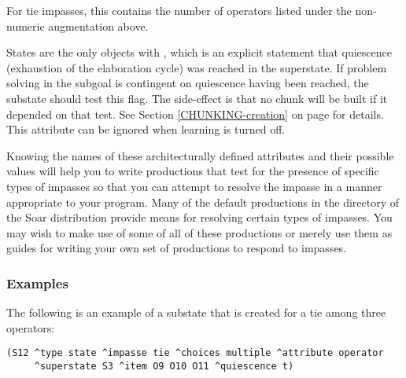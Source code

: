 \begin{description}
	\vspace{-8pt}
\item [\soar{\carat non-numeric-count}] 
	For tie impasses, this contains the number of operators listed under the non-numeric augmentation above.
	\vspace{-8pt}
\item [\soar{\carat quiescence}] 
	States are the only objects with , which is an explicit statement that quiescence (exhaustion of the elaboration cycle) was reached in the superstate.  If problem solving in the subgoal is contingent on quiescence having been reached, the substate should test this flag. The side-effect is that no chunk will be built if it depended on that test. See Section \ref{CHUNKING-creation} on page \pageref{CHUNKING-creation} for details. This attribute can be ignored when learning is turned off.
\end{description} 

Knowing the names of these architecturally defined attributes and their possible values will help you to write productions that test for the presence of specific types of impasses so that you can attempt to resolve the impasse in a manner appropriate to your program. Many of the default productions in the  directory of the Soar distribution  provide means for resolving certain types of impasses. You may wish to make use of some of all of these productions or merely use them as guides for writing your own set of productions to respond to impasses.

\subsubsection*{Examples}


The following is an example of a substate that is created for a tie among three operators:


\begin{verbatim}
(S12 ^type state ^impasse tie ^choices multiple ^attribute operator 
     ^superstate S3 ^item O9 O10 O11 ^quiescence t)
\end{verbatim} 
\vspace{12pt}

